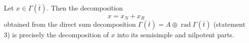 Let $x \in \Gamma(\bar{t})$. Then the decomposition
$$
x = x_N + x_R
$$
obtained from the direct sum decomposition $\Gamma(\bar{t}) = A \oplus \operatorname{rad} \Gamma(\bar{t})$ (statement 3) is precisely the decomposition of $x$ into its semisimple and nilpotent parts.
